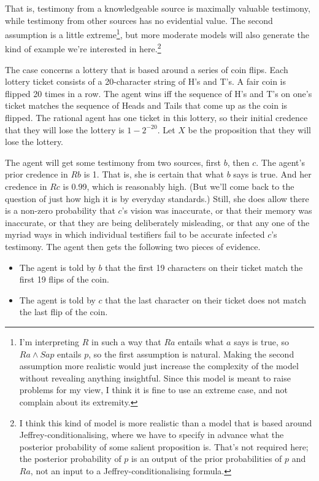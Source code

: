\noindent That is, testimony from a knowledgeable source is maximally valuable testimony, while testimony from other sources has no evidential value. The second assumption is a little extreme\footnote{I'm interpreting $R$ in such a way that $Ra$ entails what $a$ says is true, so $Ra \wedge Sap$ entails $p$, so the first assumption is natural. Making the second assumption more realistic would just increase the complexity of the model without revealing anything insightful. Since this model is meant to raise problems for my view, I think it is fine to use an extreme case, and not complain about its extremity.}, but more moderate models will also generate the kind of example we're interested in here.\footnote{ I think this kind of model is more realistic than a model that is based around Jeffrey-conditionalising, where we have to specify in advance what the posterior probability of some salient proposition is. That's not required here; the posterior probability of $p$ is an output of the prior probabilities of $p$ and $Ra$, not an input to a Jeffrey-conditionalising formula.}

The case concerns a lottery that is based around a series of coin flips. Each lottery ticket consists of a 20-character string of H's and T's. A fair coin is flipped 20 times in a row. The agent wins iff the sequence of H's and T's on one's ticket matches the sequence of Heads and Tails that come up as the coin is flipped. The rational agent has one ticket in this lottery, so their initial credence that they will lose the lottery is $1 - 2^{-20}$. Let $X$ be the proposition that they will lose the lottery.

The agent will get some testimony from two sources, first $b$, then $c$. The agent's prior credence in $Rb$ is 1. That is, she is certain that what $b$ says is true. And her credence in $Rc$ is 0.99, which is reasonably high. (But we'll come back to the question of just how high it is by everyday standards.) Still, she does allow there is a non-zero probability that $c$'s vision was inaccurate, or that their memory was inaccurate, or that they are being deliberately misleading, or that any one of the myriad ways in which individual testifiers fail to be accurate infected $c$'s testimony. The agent then gets the following two pieces of evidence.

\begin{itemize}
\item The agent is told by $b$ that the first 19 characters on their ticket match the first 19 flips of the coin.
\item The agent is told by $c$ that the last character on their ticket does not match the last flip of the coin.
\end{itemize}

